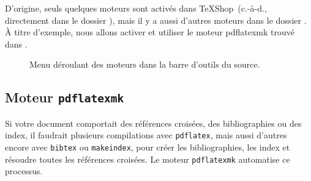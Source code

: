 \documentclass[11pt,french]{article}
\newcommand{\TS}{\textsf{\TeX Shop}}
\newcommand{\cmd}[1]{\textsf{#1}}
\begin{document}

D'origine, seuls quelques moteurs sont activés dans \TS\ (c.-à-d., directement dans le dossier ), mais il y a aussi d'autres moteurs dans le dossier . À titre d'exemple, nous allons activer et utiliser le moteur \cmd{pdflatexmk} trouvé dans .

\begin{figure}
\centering
{}
\caption{Menu déroulant des moteurs dans la barre d'outils du source.}
\label{fig:EnginesPopup}
\end{figure}

\subsection{Moteur \texttt{pdflatexmk}}

Si votre document comportait des références croisées, des bibliographies ou des index, il faudrait plusieurs compilations avec \texttt{pdflatex}, mais aussi d'autres encore avec \texttt{bibtex} ou \texttt{makeindex}, pour créer les bibliographies, les index et résoudre toutes les références croisées. Le moteur \texttt{pdflatexmk} automatise ce processus.
\end{document}
